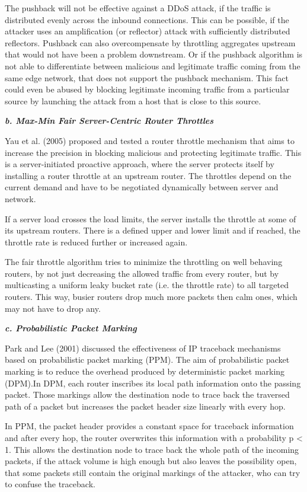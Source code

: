 The pushback will not be effective against a DDoS attack, if the traffic is distributed evenly across the inbound connections. This can be possible, if the attacker uses an amplification (or reflector) attack with sufficiently distributed reflectors. Pushback can also overcompensate by throttling aggregates upstream that would not have been a problem downstream. Or if the pushback algorithm is not able to differentiate between malicious and legitimate traffic coming from the same edge network, that does not support the pushback mechanism. This fact could even be abused by blocking legitimate incoming traffic from a particular source by launching the attack from a host that is close to this source. \cite{Mahajan02}

\textbf{\textit{b. Max-Min Fair Server-Centric Router Throttles}}

Yau et al. (2005) proposed and tested a router throttle mechanism that aims to increase the precision in blocking malicious and protecting legitimate traffic. This is a server-initiated proactive approach, where the server protects itself by installing a router throttle at an upstream router. The throttles depend on the current demand and have to be negotiated dynamically between server and network.

If a server load crosses the load limits, the server installs the throttle at some of its upstream routers. There is a defined upper and lower limit and if reached, the throttle rate is reduced further or increased again.

The fair throttle algorithm tries to minimize the throttling on well behaving routers, by not just decreasing the allowed traffic from every router, but by multicasting a uniform leaky bucket rate (i.e. the throttle rate) to all targeted routers. This way, busier routers drop much more packets then calm ones, which may not have to drop any. \cite{Yau05}

\textbf{\textit{c. Probabilistic Packet Marking}}

Park and Lee (2001) discussed the effectiveness of IP traceback mechanisms based on probabilistic packet marking (PPM). The aim of probabilistic packet marking is to reduce the overhead produced by deterministic packet marking (DPM).In DPM, each router inscribes its local path information onto the passing packet. Those markings allow the destination node to trace back the traversed path of a packet but increases the packet header size linearly with every hop.

In PPM, the packet header provides a constant space for traceback information and after every hop, the router overwrites this information with a probability p < 1. This allows the destination node to trace back the whole path of the incoming packets, if the attack volume is high enough but also leaves the possibility open, that some packets still contain the original markings of the attacker, who can try to confuse the traceback.

